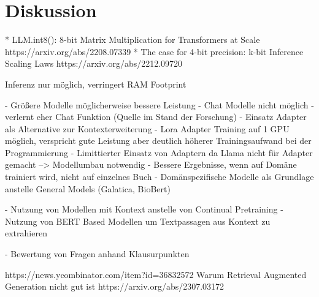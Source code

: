 \chapter{Diskussion}\label{ch:discussion}

* LLM.int8(): 8-bit Matrix Multiplication for Transformers at Scale https://arxiv.org/abs/2208.07339
* The case for 4-bit precision: k-bit Inference Scaling Laws https://arxiv.org/abs/2212.09720

Inferenz nur möglich, verringert RAM Footprint

- Größere Modelle möglicherweise bessere Leistung
- Chat Modelle nicht möglich - verlernt eher Chat Funktion (Quelle im Stand der Forschung)
- Einsatz Adapter als Alternative zur Kontexterweiterung
    - Lora Adapter Training auf 1 GPU möglich, verspricht gute Leistung aber
    deutlich höherer Trainingsaufwand bei der Programmierung
    - Limittierter Einsatz von Adaptern da Llama nicht für Adapter gemacht --> Modellumbau notwendig
- Bessere Ergebnisse, wenn auf Domäne trainiert wird, nicht auf einzelnes Buch
- Domänspezifische Modelle als Grundlage anstelle General Models (Galatica, BioBert)

- Nutzung von Modellen mit Kontext anstelle von Continual Pretraining
- Nutzung von BERT Based Modellen um Textpassagen aus Kontext zu extrahieren

- Bewertung von Fragen anhand Klausurpunkten


https://news.ycombinator.com/item?id=36832572
Warum Retrieval Augmented Generation nicht gut ist 
https://arxiv.org/abs/2307.03172


